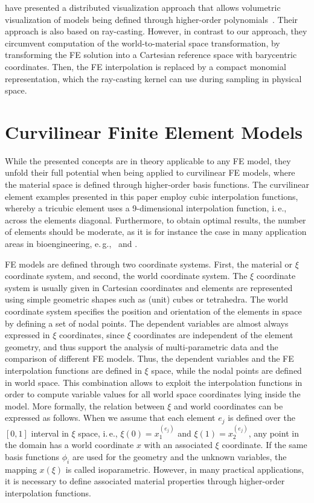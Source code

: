 \documentclass[review,journal]{vgtc}         %
\begin{document}
have presented a distributed visualization approach that allows volumetric visualization of models being defined through higher-order polynomials~\cite{uffinger10femraycasting}. Their approach is also based on ray-casting. However, in contrast to our approach, they circumvent computation of the world-to-material space transformation, by transforming the FE solution into a Cartesian reference space with barycentric coordinates. Then, the FE interpolation is replaced by a compact monomial representation, which the ray-casting kernel can use during sampling in physical space.



\section{Curvilinear Finite Element Models}\label{sec:theory}

While the presented concepts are in theory applicable to any FE model, they unfold their full potential when being applied to curvilinear FE models, where the material space is defined through higher-order basis functions. The curvilinear element examples presented in this paper employ cubic interpolation functions, whereby a tricubic element uses a 9-dimensional interpolation function, i.\,e., across the elements diagonal. Furthermore, to obtain optimal results, the number of elements should be moderate, as it is for instance the case in many application areas in bioengineering, e.\,g.,~\cite{lee10deformation} and \cite{wuensche03deformation}.

FE models are defined through two coordinate systems. First, the material or $\xi$ coordinate system, and second, the world coordinate system. The $\xi$ coordinate system is usually given in Cartesian coordinates and elements are represented using simple geometric shapes such as (unit) cubes or tetrahedra. The world coordinate system specifies the position and orientation of the elements in space by defining a set of nodal points. The dependent variables are almost always expressed in $\xi$ coordinates, since $\xi$ coordinates are independent of the element geometry, and thus support the analysis of multi-parametric data and the comparison of different FE models. Thus, the dependent variables and the FE interpolation functions are defined in $\xi$ space, while the nodal points are defined in world space. This combination allows to exploit the interpolation functions in order to compute variable values for all world space coordinates lying inside the model. More formally, the relation between $\xi$ and world coordinates can be expressed as follows. When we assume that each element $e_j$ is defined over the $[0,1]$ interval in $\xi$ space, i.\,e., $\xi(0)=x^{(e_j)}_1$ and $\xi(1)=x^{(e_j)}_2$, any point in the domain has a world coordinate $x$ with an associated $\xi$ coordinate. If the same basis functions $\phi_i$ are used for the geometry and the unknown variables, the mapping $x(\xi)$ is called isoparametric. However, in many practical applications, it is necessary to define associated material properties through higher-order interpolation functions.
\end{document}

